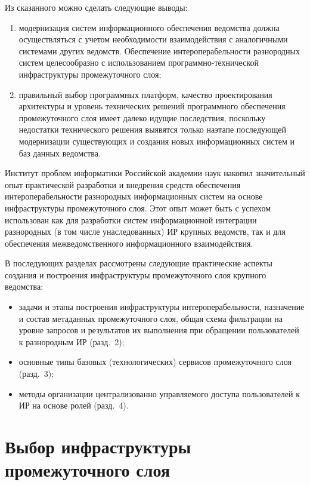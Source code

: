 \begin{multicols}{2}
      Из сказанного можно сделать следующие вы\-воды:
      \begin{enumerate}[(1)]
\item модернизация систем информационного обеспечения ведомства должна осуществляться 
с учетом необходимости взаимодействия с аналогичными системами других ведомств. 
Обеспечение интероперабельности разнородных систем целесообразно с использованием 
программно-технической инфраструктуры промежуточного слоя;
\item правильный выбор программных платформ, качество проектирования 
архитектуры и уровень технических решений программного обеспечения 
промежуточного слоя имеет далеко идущие последствия, поскольку недостатки 
технического решения выявятся только на\linebreak этапе последующей модернизации 
существующих и создания новых информационных сис\-тем и баз данных ведомства. 
\end{enumerate}
      
      Институт проблем информатики Российской академии наук 
      накопил значительный опыт практи\-ческой разработки и внедрения средств 
обеспечения интероперабельности разнородных информационных систем на основе 
инфраструктуры промежуточного слоя. Этот опыт может быть с успехом использован как для 
разработки систем информационной интеграции разнородных (в том числе унаследованных) 
ИР крупных ведомств, так и для обеспечения межведомственного 
информационного взаимодействия.
      
      В последующих разделах рассмотрены следующие практические аспекты 
создания и по\-стро\-ения инфраструктуры промежуточного слоя крупного ведомства:
      \begin{itemize}
\item задачи и этапы построения инфраструктуры интероперабельности, назначение и 
состав метаданных промежуточного слоя, общая схема фильтрации на уровне запросов и 
результатов их выполнения при обращении пользователей к разнородным 
ИР (разд.~2);
\item основные типы базовых (технологических) сервисов промежуточного слоя (разд.~3);
\item методы организации централизованно управ\-ля\-емо\-го доступа пользователей к ИР на 
основе ролей (разд.~4).
\end{itemize}

\section{Выбор инфраструктуры промежуточного слоя}


\end{multicols}
